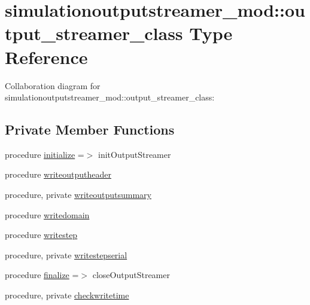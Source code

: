 \hypertarget{structsimulationoutputstreamer__mod_1_1output__streamer__class}{}\section{simulationoutputstreamer\+\_\+mod\+:\+:output\+\_\+streamer\+\_\+class Type Reference}
\label{structsimulationoutputstreamer__mod_1_1output__streamer__class}


Collaboration diagram for simulationoutputstreamer\+\_\+mod\+:\+:output\+\_\+streamer\+\_\+class\+:
\subsection*{Private Member Functions}
\begin{DoxyCompactItemize}
\item 
procedure \mbox{\hyperlink{structsimulationoutputstreamer__mod_1_1output__streamer__class_aef05ba910aa8ebe5567fae9d59989dd1}{initialize}} =$>$ init\+Output\+Streamer
\item 
procedure \mbox{\hyperlink{structsimulationoutputstreamer__mod_1_1output__streamer__class_a790aab2b95d7f236ae4c66e4456b641e}{writeoutputheader}}
\item 
procedure, private \mbox{\hyperlink{structsimulationoutputstreamer__mod_1_1output__streamer__class_ae54b9ad37209fc6cafb8c80ca70d73c3}{writeoutputsummary}}
\item 
procedure \mbox{\hyperlink{structsimulationoutputstreamer__mod_1_1output__streamer__class_a4013e6853675f44c7df2409114da35d2}{writedomain}}
\item 
procedure \mbox{\hyperlink{structsimulationoutputstreamer__mod_1_1output__streamer__class_a26f4f2807f3e0d0067db555e1351b04e}{writestep}}
\item 
procedure, private \mbox{\hyperlink{structsimulationoutputstreamer__mod_1_1output__streamer__class_a8b9e10001cb0aa3315f94647c59bb941}{writestepserial}}
\item 
procedure \mbox{\hyperlink{structsimulationoutputstreamer__mod_1_1output__streamer__class_a3c178b135b90289720d9cb549fa8dce2}{finalize}} =$>$ close\+Output\+Streamer
\item 
procedure, private \mbox{\hyperlink{structsimulationoutputstreamer__mod_1_1output__streamer__class_a2085a877c0b95c662c0012d911e34c58}{checkwritetime}}
\end{DoxyCompactItemize}
